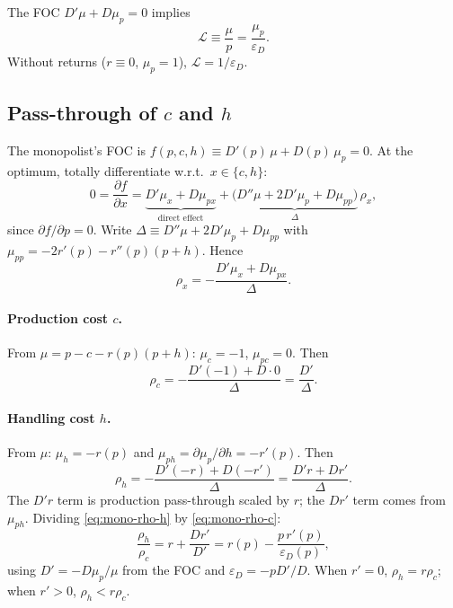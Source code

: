 \documentclass[11pt]{article}
\begin{document}
The FOC $D'\mu+D\mu_p=0$ implies
\begin{equation}
  \mathcal{L}\equiv\frac{\mu}{p}=\frac{\mu_p}{\varepsilon_D}.
  \label{eq:lerner}
\end{equation}
Without returns ($r\equiv 0$, $\mu_p=1$), $\mathcal{L}=1/\varepsilon_D$.

\subsection{Pass-through of $c$ and $h$}

The monopolist's FOC is $f(p,c,h)\equiv D'(p)\,\mu + D(p)\,\mu_p=0$.
At the optimum, totally differentiate w.r.t.\ $x\in\{c,h\}$:
\[
  0 = \frac{\partial f}{\partial x}
  = \underbrace{D'\mu_x + D\mu_{px}}_{\text{direct effect}}
  + \underbrace{\bigl(D''\mu + 2D'\mu_p + D\mu_{pp}\bigr)}_{\displaystyle\Delta}\,\rho_x,
\]
since $\partial f/\partial p=0$.  Write $\Delta\equiv D''\mu+2D'\mu_p+D\mu_{pp}$
with $\mu_{pp}=-2r'(p)-r''(p)(p+h)$.  Hence
\begin{equation}
  \rho_x = -\frac{D'\mu_x + D\mu_{px}}{\Delta}.
  \label{eq:mono-rho}
\end{equation}

\paragraph{Production cost $c$.}
From $\mu=p-c-r(p)(p+h)$: $\mu_c=-1$, $\mu_{pc}=0$.  Then
\begin{equation}
  \rho_c
  = -\frac{D'(-1)+D\cdot 0}{\Delta}
  = \frac{D'}{\Delta}.
  \label{eq:mono-rho-c}
\end{equation}

\paragraph{Handling cost $h$.}
From $\mu$: $\mu_h=-r(p)$ and
$\mu_{ph}=\partial\mu_p/\partial h=-r'(p)$.  Then
\begin{equation}
  \rho_h
  = -\frac{D'(-r)+D(-r')}{\Delta}
  = \frac{D'r + Dr'}{\Delta}.
  \label{eq:mono-rho-h}
\end{equation}
The $D'r$ term is production pass-through scaled by $r$; the $Dr'$ term comes
from $\mu_{ph}$.  Dividing \eqref{eq:mono-rho-h} by \eqref{eq:mono-rho-c}:
\begin{equation}
  \frac{\rho_h}{\rho_c}
  = r + \frac{Dr'}{D'}
  = r(p)-\frac{p\,r'(p)}{\varepsilon_D(p)},
  \label{eq:mono-ratio}
\end{equation}
using $D'=-D\mu_p/\mu$ from the FOC and $\varepsilon_D=-pD'/D$.
When $r'=0$, $\rho_h=r\rho_c$; when $r'>0$, $\rho_h<r\rho_c$.
\end{document}

